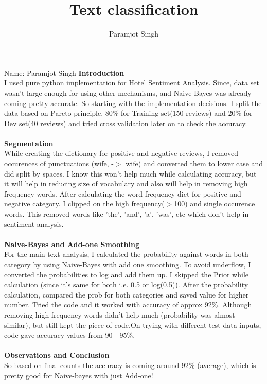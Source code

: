 \documentclass[addpoints,12pt]{exam}
\title{Text classification}
\author{Paramjot Singh}
\begin{document}
\maketitle

\pagestyle{headandfoot}
\runningheadrule
{}
              {}
              {Name: Paramjot Singh}
              \firstpagefooter{}{}{}
              \runningfooter{}{}{}
\textbf{Introduction}\\
I used pure python implementation for Hotel Sentiment Analysis. Since, data set wasn't large enough for using other mechanisms, and Naive-Bayes was already coming pretty accurate. 
So starting with the implementation decisions. I split the data based on Pareto principle. 80\% for Training set(150 reviews) and 20\% for Dev set(40 reviews) and tried cross validation later on to check the accuracy.
\\ \\
\textbf{Segmentation}\\
While creating the dictionary for positive and negative reviews, I removed occurences of punctuations (wife, -$>$ wife) and converted them to lower case and did split by spaces. I know this won't help much while calculating accuracy, but it will help in reducing size of vocabulary and also will help in removing high frequency words.
After calculating the word frequency dict for positive and negative category. I clipped on the high frequency($>$100) and single occurence words. This removed words like 'the', 'and', 'a', 'was', etc which don't help in sentiment analysis.\\ \\
\textbf{Naive-Bayes and Add-one Smoothing}\\
For the main text analysis, I calculated the probability against words in both category by using Naive-Bayes with add one smoothing. To avoid underflow, I converted the probabilities to log and add them up. I skipped the Prior while calculation (since it's same for both i.e. 0.5 or log(0.5)). After the probability calculation, compared the prob for both categories and saved value for higher number. 
Tried the code and it worked with accuracy of approx 92\%. Although removing high frequency words didn't help much (probability was almost similar), but still kept the piece of code.On trying with different test data inputs, code gave accuracy values from 90 - 95\%.\\ \\
\textbf{Observations and Conclusion}\\
So based on final counts the accuracy is coming around 92\% (average), which is pretty good for Naive-bayes with just Add-one!
\end{document}
